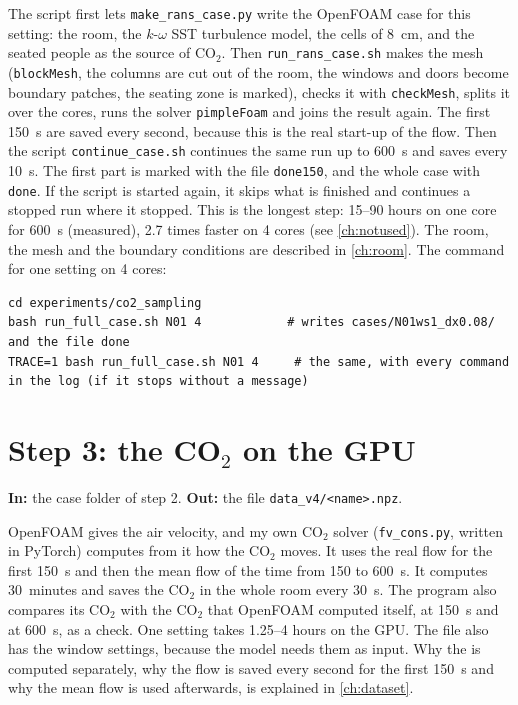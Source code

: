 The script first lets \texttt{make\_rans\_case.py} write the OpenFOAM case for this setting: the room, the $k$-$\omega$ SST
turbulence model, the cells of 8~cm, and the seated people as the source of CO$_2$. Then \texttt{run\_rans\_case.sh} makes the
mesh (\texttt{blockMesh}, the columns are cut out of the room, the windows and doors become boundary patches, the seating
zone is marked), checks it with \texttt{checkMesh}, splits it over the cores, runs the solver \texttt{pimpleFoam} and joins the
result again. The first 150~s are saved every second, because this is the real start-up of the flow. Then the script
\texttt{continue\_case.sh} continues the same run up to 600~s and saves every 10~s. The first part is marked with the file
\texttt{done150}, and the whole case with \texttt{done}. If the script is started again, it skips what is finished and
continues a stopped run where it stopped. This is the longest step: 15--90 hours on one core for 600~s (measured), 2.7 times
faster on 4 cores (see \cref{ch:notused}). The room, the mesh and the boundary conditions are described in
\cref{ch:room}. The command for one setting on 4 cores:

\begin{lstlisting}[breaklines=true,postbreak=\space]
cd experiments/co2_sampling
bash run_full_case.sh N01 4            # writes cases/N01ws1_dx0.08/ and the file done
TRACE=1 bash run_full_case.sh N01 4     # the same, with every command in the log (if it stops without a message)
\end{lstlisting}


\section{Step 3: the CO$_2$ on the GPU}
\textbf{In:} the case folder of step 2. \textbf{Out:} the file \texttt{data\_v4/<name>.npz}.

OpenFOAM gives the air velocity, and my own CO$_2$ solver (\texttt{fv\_cons.py}, written in PyTorch) computes from it how the CO$_2$ moves.
It uses the real flow for the first 150~s and then the mean flow of the time from 150 to 600~s. It computes 30~minutes and
saves the CO$_2$ in the whole room every 30~s. The program also compares its CO$_2$ with the CO$_2$ that OpenFOAM computed itself,
at 150~s and at 600~s, as a check. One setting takes 1.25--4 hours on the GPU. The file also has the window settings, because
the model needs them as input. Why the \cotwo{} is computed separately, why the flow is saved every second for the first 150~s
and why the mean flow is used afterwards, is explained in \cref{ch:dataset}.

